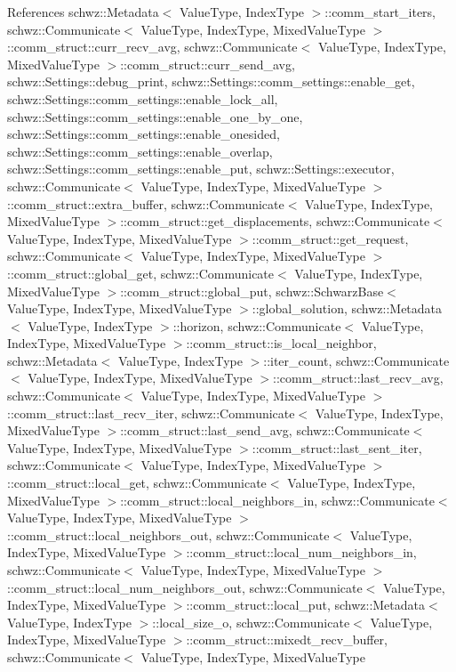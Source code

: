 References schwz\+::\+Metadata$<$ Value\+Type, Index\+Type $>$\+::comm\+\_\+start\+\_\+iters, schwz\+::\+Communicate$<$ Value\+Type, Index\+Type, Mixed\+Value\+Type $>$\+::comm\+\_\+struct\+::curr\+\_\+recv\+\_\+avg, schwz\+::\+Communicate$<$ Value\+Type, Index\+Type, Mixed\+Value\+Type $>$\+::comm\+\_\+struct\+::curr\+\_\+send\+\_\+avg, schwz\+::\+Settings\+::debug\+\_\+print, schwz\+::\+Settings\+::comm\+\_\+settings\+::enable\+\_\+get, schwz\+::\+Settings\+::comm\+\_\+settings\+::enable\+\_\+lock\+\_\+all, schwz\+::\+Settings\+::comm\+\_\+settings\+::enable\+\_\+one\+\_\+by\+\_\+one, schwz\+::\+Settings\+::comm\+\_\+settings\+::enable\+\_\+onesided, schwz\+::\+Settings\+::comm\+\_\+settings\+::enable\+\_\+overlap, schwz\+::\+Settings\+::comm\+\_\+settings\+::enable\+\_\+put, schwz\+::\+Settings\+::executor, schwz\+::\+Communicate$<$ Value\+Type, Index\+Type, Mixed\+Value\+Type $>$\+::comm\+\_\+struct\+::extra\+\_\+buffer, schwz\+::\+Communicate$<$ Value\+Type, Index\+Type, Mixed\+Value\+Type $>$\+::comm\+\_\+struct\+::get\+\_\+displacements, schwz\+::\+Communicate$<$ Value\+Type, Index\+Type, Mixed\+Value\+Type $>$\+::comm\+\_\+struct\+::get\+\_\+request, schwz\+::\+Communicate$<$ Value\+Type, Index\+Type, Mixed\+Value\+Type $>$\+::comm\+\_\+struct\+::global\+\_\+get, schwz\+::\+Communicate$<$ Value\+Type, Index\+Type, Mixed\+Value\+Type $>$\+::comm\+\_\+struct\+::global\+\_\+put, schwz\+::\+Schwarz\+Base$<$ Value\+Type, Index\+Type, Mixed\+Value\+Type $>$\+::global\+\_\+solution, schwz\+::\+Metadata$<$ Value\+Type, Index\+Type $>$\+::horizon, schwz\+::\+Communicate$<$ Value\+Type, Index\+Type, Mixed\+Value\+Type $>$\+::comm\+\_\+struct\+::is\+\_\+local\+\_\+neighbor, schwz\+::\+Metadata$<$ Value\+Type, Index\+Type $>$\+::iter\+\_\+count, schwz\+::\+Communicate$<$ Value\+Type, Index\+Type, Mixed\+Value\+Type $>$\+::comm\+\_\+struct\+::last\+\_\+recv\+\_\+avg, schwz\+::\+Communicate$<$ Value\+Type, Index\+Type, Mixed\+Value\+Type $>$\+::comm\+\_\+struct\+::last\+\_\+recv\+\_\+iter, schwz\+::\+Communicate$<$ Value\+Type, Index\+Type, Mixed\+Value\+Type $>$\+::comm\+\_\+struct\+::last\+\_\+send\+\_\+avg, schwz\+::\+Communicate$<$ Value\+Type, Index\+Type, Mixed\+Value\+Type $>$\+::comm\+\_\+struct\+::last\+\_\+sent\+\_\+iter, schwz\+::\+Communicate$<$ Value\+Type, Index\+Type, Mixed\+Value\+Type $>$\+::comm\+\_\+struct\+::local\+\_\+get, schwz\+::\+Communicate$<$ Value\+Type, Index\+Type, Mixed\+Value\+Type $>$\+::comm\+\_\+struct\+::local\+\_\+neighbors\+\_\+in, schwz\+::\+Communicate$<$ Value\+Type, Index\+Type, Mixed\+Value\+Type $>$\+::comm\+\_\+struct\+::local\+\_\+neighbors\+\_\+out, schwz\+::\+Communicate$<$ Value\+Type, Index\+Type, Mixed\+Value\+Type $>$\+::comm\+\_\+struct\+::local\+\_\+num\+\_\+neighbors\+\_\+in, schwz\+::\+Communicate$<$ Value\+Type, Index\+Type, Mixed\+Value\+Type $>$\+::comm\+\_\+struct\+::local\+\_\+num\+\_\+neighbors\+\_\+out, schwz\+::\+Communicate$<$ Value\+Type, Index\+Type, Mixed\+Value\+Type $>$\+::comm\+\_\+struct\+::local\+\_\+put, schwz\+::\+Metadata$<$ Value\+Type, Index\+Type $>$\+::local\+\_\+size\+\_\+o, schwz\+::\+Communicate$<$ Value\+Type, Index\+Type, Mixed\+Value\+Type $>$\+::comm\+\_\+struct\+::mixedt\+\_\+recv\+\_\+buffer, schwz\+::\+Communicate$<$ Value\+Type, Index\+Type, Mixed\+Value\+Type 